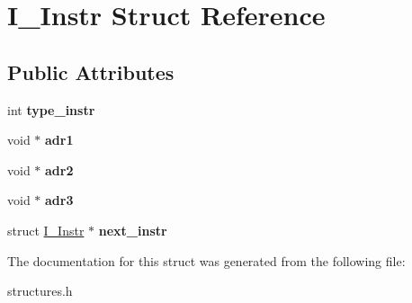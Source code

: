 \hypertarget{structI__Instr}{}\section{I\+\_\+\+Instr Struct Reference}
\label{structI__Instr}
\subsection*{Public Attributes}
\begin{DoxyCompactItemize}
\item 
\hypertarget{structI__Instr_a9b06c5d4a207c3a7fb042659d5b3f7db}{}int {\bfseries type\+\_\+instr}\label{structI__Instr_a9b06c5d4a207c3a7fb042659d5b3f7db}

\item 
\hypertarget{structI__Instr_a4f4318412398660c90bfd829302d6d40}{}void $\ast$ {\bfseries adr1}\label{structI__Instr_a4f4318412398660c90bfd829302d6d40}

\item 
\hypertarget{structI__Instr_a724bd5c33289dc42cb4c771e860353ae}{}void $\ast$ {\bfseries adr2}\label{structI__Instr_a724bd5c33289dc42cb4c771e860353ae}

\item 
\hypertarget{structI__Instr_ac2cca07784ad265ada9bcdcbf0d1c243}{}void $\ast$ {\bfseries adr3}\label{structI__Instr_ac2cca07784ad265ada9bcdcbf0d1c243}

\item 
\hypertarget{structI__Instr_a943b98c8500854fa836c70843f50342f}{}struct \hyperlink{structI__Instr}{I\+\_\+\+Instr} $\ast$ {\bfseries next\+\_\+instr}\label{structI__Instr_a943b98c8500854fa836c70843f50342f}

\end{DoxyCompactItemize}


The documentation for this struct was generated from the following file\+:\begin{DoxyCompactItemize}
\item 
structures.\+h\end{DoxyCompactItemize}
